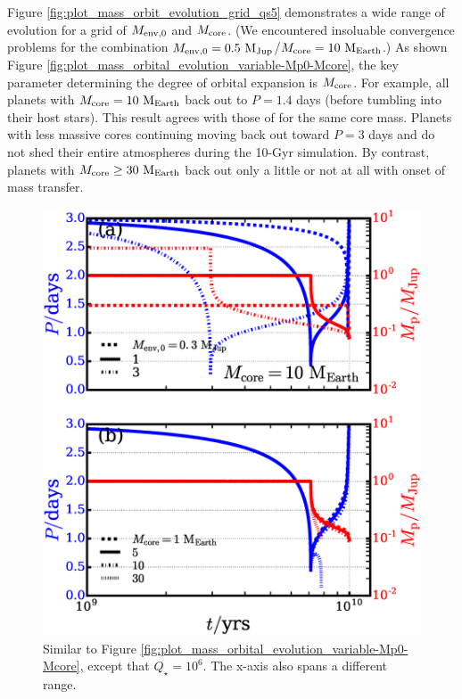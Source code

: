 \documentclass{svjour3}                     %
\begin{document}
Figure \ref{fig:plot_mass_orbit_evolution_grid_qs5} demonstrates a wide range of evolution for a grid of $M_{\rm env, 0}$ and $M_{\rm core}$. (We encountered insoluable convergence problems for the combination $M_{\rm env, 0} = 0.5\ {\rm M_{Jup}}$/$M_{\rm core} = 10\ {\rm M_{Earth}}$.) As shown Figure \ref{fig:plot_mass_orbital_evolution_variable-Mp0-Mcore}, the key parameter determining the degree of orbital expansion is $M_{\rm core}$. For example, all planets with $M_{\rm core} = 10\ {\rm M_{Earth}}$ back out to $P = 1.4$ days (before tumbling into their host stars). This result agrees with those of \cite{2015ApJ...813..101V} for the same core mass. Planets with less massive cores continuing moving back out toward $P = 3$ days and do not shed their entire atmospheres during the 10-Gyr simulation. By contrast, planets with $M_{\rm core} \ge 30\ {\rm M_{Earth}}$ back out only a little or not at all with onset of mass transfer. 

\begin{figure}
\includegraphics[width=\textwidth]{plot_mass_orbital_evolution_variable-Mp0-Mcore_qs6}
\caption{Similar to Figure \ref{fig:plot_mass_orbital_evolution_variable-Mp0-Mcore}, except that $Q_\star = 10^6$. The x-axis also spans a different range.}
\label{fig:plot_mass_orbital_evolution_variable-Mp0-Mcore_qs6}
\end{figure}
\end{document}
